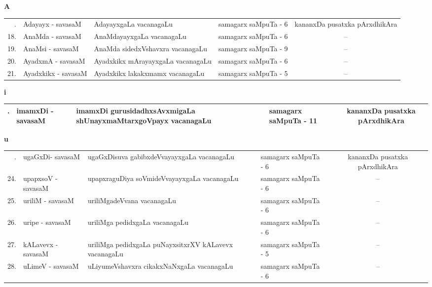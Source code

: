 \newpage

\centerline{\bf A}

\medskip

{\renewcommand{\arraystretch}{1.35}
\begin{longtable}{rl>{\raggedright}p{5.5cm}lc}
\hline
\endfirsthead
\hline
\endhead
\hline
\endfoot
\endlastfoot
17. & Adayayx - savasaM & AdayayxgaLa vacanagaLu & samagarx saMpuTa - 6 & kananxDa pusatxka pArxdhikAra\\
18. & AnaMda - savasaM & AnaMdayayxgaLa vacanagaLu & samagarx saMpuTa - 6 & --\\
19. & AnaMsi - savasaM & AnaMda sidedxVshavxra vacanagaLu & samagarx saMpuTa - 9 & --\\
20. & AyadxmA - savasaM & Ayadxkikx mArayayxgaLa vacanagaLu & samagarx saMpuTa - 6 & --\\
21. & Ayadxkikx - savasaM & Ayadxkikx lakakxmamx vacanagaLu & samagarx saMpuTa - 5 & --\\
\hline
\end{longtable}}

\centerline{\bf i}

{\renewcommand{\arraystretch}{1.35}
\begin{longtable}{rl>{\raggedright}p{5.5cm}lc}
\hline
\endfirsthead
\hline
\endhead
\hline
\endfoot
\endlastfoot
22. & imamxDi - savasaM & imamxDi gurusidadhxsAvxmigaLa shUnayxmaMtarxgoVpayx vacanagaLu & samagarx saMpuTa - 11 & kananxDa pusatxka pArxdhikAra\\
\hline
\end{longtable}}



\centerline{\bf u}

{\renewcommand{\arraystretch}{1.35}
\begin{longtable}{rl>{\raggedright}p{5.5cm}lc}
\hline
\endfirsthead
\hline
\endhead
\hline
\endfoot
\endlastfoot
23. &  ugaGxDi- savasaM & ugaGxDisuva gabibxdeVvayayxgaLa vacanagaLu & samagarx saMpuTa - 6  & kananxDa pusatxka pArxdhikAra\\
24. &  upapxsoV - savasaM & upapxraguDiya soVmideVvayayxgaLa vacanagaLu & samagarx saMpuTa - 6 & --\\
25. &  uriliM - savasaM & uriliMgadeVvana vacanagaLu & samagarx saMpuTa - 6 & --\\
26. &  uripe - savasaM & uriliMga pedidxgaLa vacanagaLu & samagarx saMpuTa - 6 & --\\
27. &  kALavevx - savasaM & uriliMga pedidxgaLa puNayxsitxrXV kALavevx vacanagaLu & samagarx saMpuTa - 5 & --\\
28. &  uLimeV - savasaM & uLiyumeVshavxra cikakxNaNxgaLa vacanagaLu & samagarx saMpuTa - 6  & --\\
\hline
\end{longtable}}


